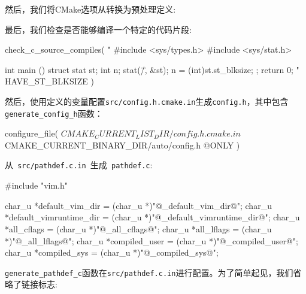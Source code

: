 然后，我们将CMake选项从转换为预处理定义:


最后，我们检查是否能够编译一个特定的代码片段:

\begin{codebox}[cmake]
check_c_source_compiles(
  "
  #include <sys/types.h>
  #include <sys/stat.h>
  
  int
  main ()
  {
    struct stat st;
    int n;
    stat(\"/\", &st);
    n = (int)st.st_blksize;
    ;
    return 0;
  }
  "
  HAVE_ST_BLKSIZE
  )
\end{codebox}

然后，使用定义的变量配置\texttt{src/config.h.cmake.in}生成\texttt{config.h}，其中包含\texttt{generate\_config\_h}函数：

\begin{codebox}[cmake]
configure_file(
  ${CMAKE_CURRENT_LIST_DIR}/config.h.cmake.in
  ${CMAKE_CURRENT_BINARY_DIR}/auto/config.h
  @ONLY
  )
\end{codebox}


从\texttt{ src/pathdef.c.in }生成\texttt{ pathdef.c}:

\begin{codebox}[cpp]
#include "vim.h"

char_u *default_vim_dir = (char_u *)"@_default_vim_dir@";
char_u *default_vimruntime_dir = (char_u *)"@_default_vimruntime_dir@";
char_u *all_cflags = (char_u *)"@_all_cflags@";
char_u *all_lflags = (char_u *)"@_all_lflags@";
char_u *compiled_user = (char_u *)"@_compiled_user@";
char_u *compiled_sys = (char_u *)"@_compiled_sys@";
\end{codebox}

\texttt{generate\_pathdef\_c}函数在\texttt{src/pathdef.c.in}进行配置。为了简单起见，我们省略了链接标志:

